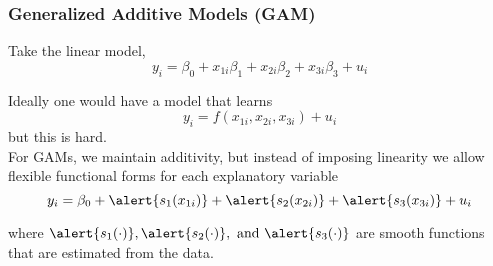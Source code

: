 \documentclass{beamer}
\numberwithin{equation}{section}
\begin{document}
 \begin{frame}[fragile]
\frametitle{Generalized Additive Models (GAM)}

Take the linear model,
$$
y_i = \beta_0 + x_{1i}\beta_1 + x_{2i}\beta_2 + x_{3i}\beta_3 + u_i
$$

Ideally one would have a model that learns 
$$
y_i = f( x_{1i}, x_{2i},x_{3i}) + u_i
$$
but this is hard.\\\bigskip
For GAMs, we maintain additivity, but instead of imposing linearity we allow flexible functional forms for each explanatory variable$$
y_i = \beta_0 + \alert{s_1(x_{1i})} + \alert{s_2(x_{2i})} + \alert{s_3(x_{3i})} + u_i
$$

 where $\alert{s_1(\cdot)}, \alert{s_2(\cdot)},\,\, \mbox{and} \,\,\alert{s_3(\cdot)}$ are
smooth functions that are estimated from the data.


\end{frame}

\end{document}
